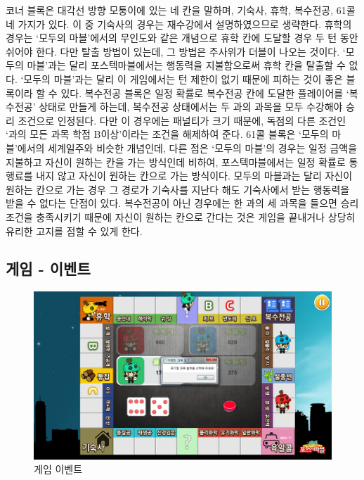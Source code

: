 \documentclass[10pt,oneside,a4paper,titlepage]{article}
\begin{document}
코너 블록은 대각선 방향 모퉁이에 있는 네 칸을 말하며, 기숙사, 휴학, 복수전공, 61콜 네 가지가 있다. 이 중 기숙사의 경우는 재수강에서 설명하였으므로 생략한다. 
휴학의 경우는 ‘모두의 마블’에서의 무인도와 같은 개념으로 휴학 칸에 도달할 경우 두 턴 동안 쉬어야 한다. 다만 탈출 방법이 있는데, 그 방법은 주사위가 더블이 나오는 것이다. ‘모두의 마블’과는 달리 포스텍마블에서는 행동력을 지불함으로써 휴학 칸을 탈출할 수 없다. ‘모두의 마블’과는 달리 이 게임에서는 턴 제한이 없기 때문에 피하는 것이 좋은 블록이라 할 수 있다.
복수전공 블록은 일정 확률로 복수전공 칸에 도달한 플레이어를 ‘복수전공’ 상태로 만들게 하는데, 복수전공 상태에서는 두 과의 과목을 모두 수강해야 승리 조건으로 인정된다. 다만 이 경우에는 패널티가 크기 때문에, 독점의 다른 조건인 ‘과의 모든 과목 학점 B이상’이라는 조건을 해제하여 준다.
61콜 블록은 ‘모두의 마블’에서의 세계일주와 비슷한 개념인데, 다른 점은 ‘모두의 마블’의 경우는 일정 금액을 지불하고 자신이 원하는 칸을 가는 방식인데 비하여, 포스텍마블에서는 일정 확률로 통행료를 내지 않고 자신이 원하는 칸으로 가는 방식이다. 모두의 마블과는 달리 자신이 원하는 칸으로 가는 경우 그 경로가 기숙사를 지난다 해도 기숙사에서 받는 행동력을 받을 수 없다는 단점이 있다. 복수전공이 아닌 경우에는 한 과의 세 과목을 들으면 승리 조건을 충족시키기 때문에 자신이 원하는 칸으로 간다는 것은 게임을 끝내거나 상당히 유리한 고지를 점할 수 있게 한다.

\subsection{게임 - 이벤트}

\begin{figure}[H]
\centering
\centerline{\includegraphics[scale=0.65]{images/9event1}}
\caption{게임 이벤트}
\end{figure}
\end{document}
